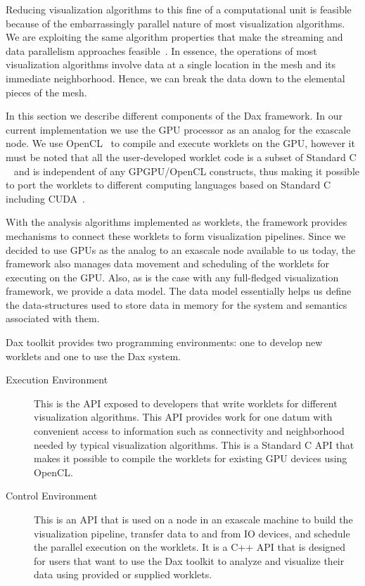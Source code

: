 \documentclass{vgtc}                          %
\newcommand*{\lcite}[1]{~\cite{#1}}
\begin{document}
Reducing visualization algorithms to this fine of a computational unit is
feasible because of the embarrassingly parallel nature of most
visualization algorithms.  We are exploiting the same algorithm properties
that make the streaming and data parallelism approaches
feasible\lcite{Ahrens00,Ahrens01}.  In essence, the operations of most
visualization algorithms involve data at a single location in the mesh and
its immediate neighborhood.  Hence, we can break the data down to the
elemental pieces of the mesh. 

In this section we describe different components of the Dax framework. In our
current implementation we use the GPU processor as an analog for the exascale
node. We use OpenCL\lcite{OpenCL} to compile and execute worklets on the GPU, however it must
be noted that all the user-developed worklet code is a subset of Standard C
\lcite{ANSIC} and
is independent of any GPGPU/OpenCL constructs, thus making it possible to port
the worklets to different computing languages based on Standard C including CUDA\lcite{CUDA}.

With the analysis algorithms implemented as worklets, the framework provides 
mechanisms to connect these worklets to form visualization pipelines. Since we
decided to use GPUs as the analog to an exascale node available to us today, the
framework also manages data movement and scheduling of the worklets for
executing on the GPU. Also, as is the case with any full-fledged visualization
framework, we provide a data model. The data model essentially helps us
define the data-structures used to store data in memory for the system and
semantics associated with them.

Dax toolkit provides two programming environments: one to develop new worklets and one to use the Dax system.

\begin{description}
\item[Execution Environment] This is the API exposed to developers that
write worklets for different visualization algorithms. This API provides
work for one datum with convenient access to information such as
connectivity and neighborhood needed by typical visualization algorithms. This
is a Standard C API that makes it possible to compile the worklets for
existing GPU devices using OpenCL.
\item[Control Environment] This is an API that is used on a node in an
exascale machine to build the visualization pipeline, transfer data to and from
IO devices, and schedule the parallel execution on the worklets. It is a C++ API
that is designed for users that want to use the Dax toolkit to analyze and
visualize their data using provided or supplied worklets.
\end{description}
\end{document}
